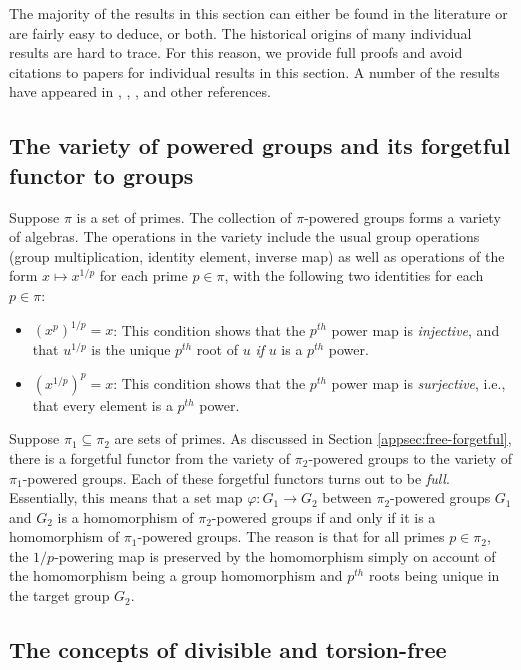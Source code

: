 The majority of the results in this section can either be found in the
literature or are fairly easy to deduce, or both. The historical
origins of many individual results are hard to trace. For this reason,
we provide full proofs and avoid citations to papers for individual
results in this section. A number of the results have appeared in
\cite{Baumslagunique}, \cite{ConciseII}, \cite{Khukhro}, and other
references.

\subsection{The variety of powered groups and its forgetful functor to groups}\label{sec:variety-powered-forgetful-functor}

Suppose $\pi$ is a set of primes. The collection of $\pi$-powered
groups forms a variety of algebras. The operations in the variety
include the usual group operations (group multiplication, identity
element, inverse map) as well as operations of the form $x \mapsto
x^{1/p}$ for each prime $p \in \pi$, with the following two identities
for each $p \in \pi$:

\begin{itemize}
\item $(x^p)^{1/p} = x$: This condition shows that the $p^{th}$
  power map is {\em injective}, and that $u^{1/p}$ is the unique
  $p^{th}$ root of $u$ {\em if} $u$ is a $p^{th}$ power.
\item $(x^{1/p})^p = x$: This condition shows that the $p^{th}$ power
  map is {\em surjective}, i.e., that every element is a $p^{th}$
  power.
\end{itemize}

Suppose $\pi_1 \subseteq \pi_2$ are sets of primes. As discussed in
Section \ref{appsec:free-forgetful}, there is a forgetful functor from
the variety of $\pi_2$-powered groups to the variety of
$\pi_1$-powered groups. Each of these forgetful functors turns out to
be {\em full}. Essentially, this means that a set map $\varphi:G_1 \to
G_2$ between $\pi_2$-powered groups $G_1$ and $G_2$ is a homomorphism
of $\pi_2$-powered groups if and only if it is a homomorphism of
$\pi_1$-powered groups. The reason is that for all primes $p \in
\pi_2$, the $1/p$-powering map is preserved by the homomorphism simply
on account of the homomorphism being a group homomorphism and $p^{th}$
roots being unique in the target group $G_2$.


\subsection{The concepts of divisible and torsion-free}\label{sec:divisible-and-torsion-free}

